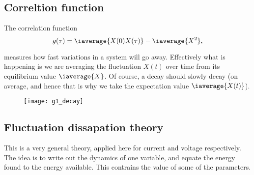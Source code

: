   \subsection{Correltion function}
  The correlation function
  \begin{equation}\label{eqn:corr1}
    g(\tau) = \iaverage{X(0)X(\tau)} - \iaverage{X^2},
  \end{equation}

  \noindent  measures how  fast variations  in a  system will  go away.
  Effectively what  is happening  is we  are averaging  the fluctuation
  $ X(t)  $ over time from  its equilibrium value $  \iaverage{X} $. Of
  course, a  decay should slowly decay  (on average, and hence  that is
  why we take the expectation value $ \iaverage{X(t)} $).

\begin{figure}[h]
  \centering \texttt{[image: g1\_decay]}
\end{figure}

\noindent


 \subsection{Fluctuation dissapation theory}\label{subsec:fluctuationDissapation}
 This is  a very general theory,  applied here for current  and voltage
 respectively. The idea  is to write out the dynamics  of one variable,
 and equate the  energy found to the energy  available.  This contrains
 the value of some of the parameters.

